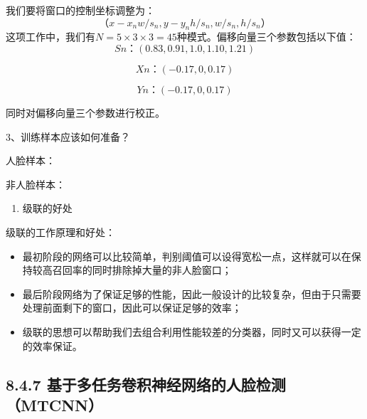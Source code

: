 我们要将窗口的控制坐标调整为： \[
（x-{x_nw}/{s_n},y-{y_nh}/{s_n},{w}/{s_n},{h}/{s_n}）
\] 这项工作中，我们有\(N=5×3×3=45\)种模式。偏移向量三个参数包括以下值：
\[
Sn：(0.83,0.91,1.0,1.10,1.21)    
\]

\[
Xn：(-0.17,0,0.17)
\]

\[
Yn：(-0.17,0,0.17)
\]

同时对偏移向量三个参数进行校正。

\begin{figure}
\centering
\caption{}
\end{figure}

3、训练样本应该如何准备？

人脸样本：

非人脸样本：

\begin{enumerate}
\def\labelenumi{\arabic{enumi}.}
\setcounter{enumi}{3}
\item
  级联的好处
\end{enumerate}

级联的工作原理和好处：

\begin{itemize}
\item
  最初阶段的网络可以比较简单，判别阈值可以设得宽松一点，这样就可以在保持较高召回率的同时排除掉大量的非人脸窗口；
\item
  最后阶段网络为了保证足够的性能，因此一般设计的比较复杂，但由于只需要处理前面剩下的窗口，因此可以保证足够的效率；
\item
  级联的思想可以帮助我们去组合利用性能较差的分类器，同时又可以获得一定的效率保证。
\end{itemize}

\subsection{8.4.7
基于多任务卷积神经网络的人脸检测（MTCNN）}\label{ux57faux4e8eux591aux4efbux52a1ux5377ux79efux795eux7ecfux7f51ux7edcux7684ux4ebaux8138ux68c0ux6d4bmtcnn}

\begin{figure}
\centering
\caption{}
\end{figure}

\begin{figure}
\centering
\caption{}
\end{figure}

\begin{figure}
\centering
\caption{}
\end{figure}

